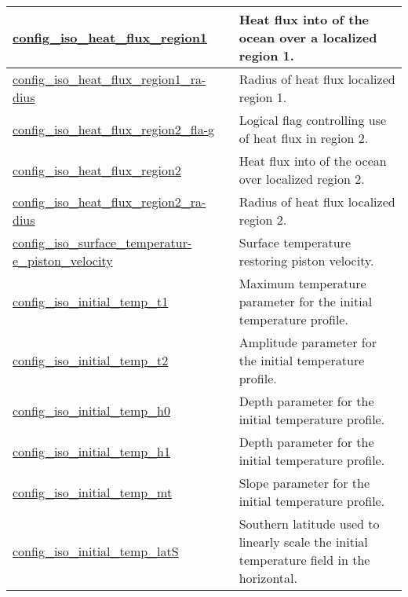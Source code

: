 {\begin{center}
\begin{longtable}{| p{2.0in} || p{4.0in} |}
    \hline
    \hyperref[subsec:nm_sec_config_iso_heat_flux_region1]{config\_iso\_heat\_flux\_region1} & Heat flux into of the ocean over a localized region 1. \\
    \hline
    \hyperref[subsec:nm_sec_config_iso_heat_flux_region1_radius]{config\_iso\_heat\_flux\_region1\_ra-}\hyperref[subsec:nm_sec_config_iso_heat_flux_region1_radius]{dius}& Radius of heat flux localized region 1. \\
    \hline
    \hyperref[subsec:nm_sec_config_iso_heat_flux_region2_flag]{config\_iso\_heat\_flux\_region2\_fla-}\hyperref[subsec:nm_sec_config_iso_heat_flux_region2_flag]{g}& Logical flag controlling use of heat flux in region 2. \\
    \hline
    \hyperref[subsec:nm_sec_config_iso_heat_flux_region2]{config\_iso\_heat\_flux\_region2} & Heat flux into of the ocean over localized region 2. \\
    \hline
    \hyperref[subsec:nm_sec_config_iso_heat_flux_region2_radius]{config\_iso\_heat\_flux\_region2\_ra-}\hyperref[subsec:nm_sec_config_iso_heat_flux_region2_radius]{dius}& Radius of heat flux localized region 2. \\
    \hline
    \hyperref[subsec:nm_sec_config_iso_surface_temperature_piston_velocity]{config\_iso\_surface\_temperatur-}\hyperref[subsec:nm_sec_config_iso_surface_temperature_piston_velocity]{e\_piston\_velocity}& Surface temperature restoring piston velocity. \\
    \hline
    \hyperref[subsec:nm_sec_config_iso_initial_temp_t1]{config\_iso\_initial\_temp\_t1} & Maximum temperature parameter for the initial temperature profile. \\
    \hline
    \hyperref[subsec:nm_sec_config_iso_initial_temp_t2]{config\_iso\_initial\_temp\_t2} & Amplitude parameter for the initial temperature profile. \\
    \hline
    \hyperref[subsec:nm_sec_config_iso_initial_temp_h0]{config\_iso\_initial\_temp\_h0} & Depth parameter for the initial temperature profile. \\
    \hline
    \hyperref[subsec:nm_sec_config_iso_initial_temp_h1]{config\_iso\_initial\_temp\_h1} & Depth parameter for the initial temperature profile. \\
    \hline
    \hyperref[subsec:nm_sec_config_iso_initial_temp_mt]{config\_iso\_initial\_temp\_mt} & Slope parameter for the initial temperature profile. \\
    \hline
    \hyperref[subsec:nm_sec_config_iso_initial_temp_latS]{config\_iso\_initial\_temp\_latS} & Southern latitude used to linearly scale the initial temperature field in the horizontal. \\

\end{longtable}
\end{center}}
